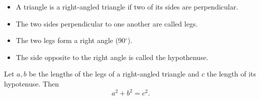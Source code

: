 \begin{frame}
\begin{itemize}
\item A triangle is a right-angled triangle if two of its sides are perpendicular.
\item The two sides perpendicular to one another are called legs. 
\item The two legs form a right angle (90$^{\circ}$).
\item The side opposite to the right angle is called the hypothenuse. 
\end{itemize}

\begin{theorem}
Let $a,b$ be the lengths of the legs of a right-angled triangle and $c$ the length of its hypotenuse. Then
\[
a^2+b^2=c^2.
\]
\end{theorem}

\end{frame}